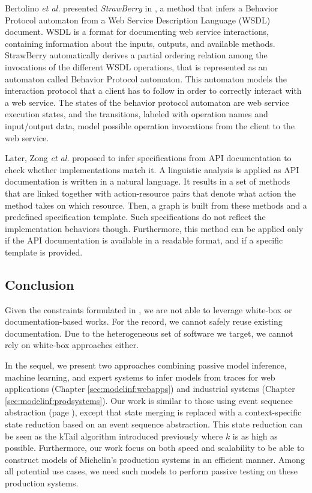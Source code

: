 Bertolino \emph{et al.} presented \textit{StrawBerry} in
\cite{Bertolino:2009:ASB:1595696.1595719}, a method that infers a
Behavior Protocol automaton from a Web Service Description
Language (WSDL) document.  WSDL is a format for documenting web
service interactions, containing information about the inputs,
outputs, and available methods. StrawBerry automatically derives a
partial ordering relation among the invocations of the different
WSDL operations, that is represented as an automaton called
Behavior Protocol automaton.  This automaton models the
interaction protocol that a client has to follow in order to
correctly interact with a web service.  The states of the
behavior protocol automaton are web service execution states, and
the transitions, labeled with operation names and input/output
data, model possible operation invocations from the client to the
web service.

Later, Zong \emph{et al.} \cite{ZhongZXM11} proposed to infer
specifications from API documentation to check whether
implementations match it. A linguistic analysis is applied as API
documentation is written in a natural language. It results in a
set of methods that are linked together with action-resource
pairs that denote what action the method takes on which resource.
Then, a graph is built from these methods and a predefined
specification template. Such specifications do not reflect the
implementation behaviors though. Furthermore, this method can be
applied only if the API documentation is available in a readable
format, and if a specific template is provided.

\subsection{Conclusion}

Given the constraints formulated in
, we are not able to
leverage white-box or documentation-based works. For the record,
we cannot safely reuse existing documentation. Due to the
heterogeneous set of software we target, we cannot rely on
white-box approaches either.

In the sequel, we present two approaches combining passive model
inference, machine learning, and expert systems to infer models
from traces for web applications (Chapter
\ref{sec:modelinf:webapps}) and industrial systems (Chapter
\ref{sec:modelinf:prodsystems}).  Our work is similar to those
using event sequence abstraction (page
\pageref{sec:passive-fsa}), except that state merging is replaced
with a context-specific state reduction based on an event
sequence abstraction. This state reduction can be seen as the
kTail algorithm introduced previously where $k$ is as high as
possible. Furthermore, our work focus on both speed and
scalability to be able to construct models of Michelin's
production systems in an efficient manner. Among all potential
use cases, we need such models to perform passive testing on
these production systems.

